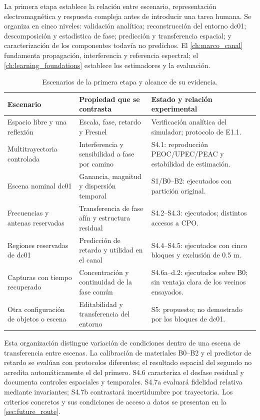 La primera etapa establece la relación entre escenario, representación electromagnética
y respuesta compleja antes de introducir una tarea humana. Se organiza en cinco niveles:
validación analítica; reconstrucción del entorno dc01; descomposición y estadística de fase;
predicción y transferencia espacial; y caracterización de los componentes todavía no
predichos. El \cref{ch:marco_canal} fundamenta propagación, interferencia y referencia
espectral; el \cref{ch:learning_foundations} establece los estimadores y la evaluación.

\begin{table}[htbp]
\centering\small
\caption{Escenarios de la primera etapa y alcance de su evidencia.}
\begin{tabularx}{\textwidth}{P{2.8cm}L L}
\toprule
Escenario & Propiedad que se contrasta & Estado y relación experimental\\
\midrule
Espacio libre y una reflexión & Escala, fase, retardo y Fresnel & Verificación analítica del simulador; protocolo de E1.1.\\
Multitrayectoria controlada & Interferencia y sensibilidad a fase por camino & S4.1: reproducción PEOC/UPEC/PEAC y estabilidad de estimación.\\
Escena nominal dc01 & Ganancia, magnitud y dispersión temporal & S1/B0--B2: ejecutados con partición original.\\
Frecuencias y antenas reservadas & Transferencia de fase afín y estructura residual & S4.2--S4.3: ejecutados; distintos accesos a CPO.\\
Regiones reservadas de dc01 & Predicción de retardo y utilidad en el canal & S4.4--S4.5: ejecutados con cinco bloques y exclusión de 0.5 m.\\
Capturas con tiempo recuperado & Concentración y continuidad de la fase común & S4.6a--d.2: ejecutados sobre B0; sin ventaja clara de los vecinos ensayados.\\
Otra configuración de objetos o escena & Editabilidad y transferencia del entorno & S5: propuesto; no demostrado por los bloques de dc01.\\
\bottomrule
\end{tabularx}
\end{table}

Esta organización distingue variación de condiciones dentro de una escena de transferencia
entre escenas. La calibración de materiales B0--B2 y el predictor de retardo se evalúan
con protocolos diferentes; el resultado espacial del segundo no acredita automáticamente
el del primero. S4.6 caracteriza el desfase residual y documenta controles
espaciales y temporales. S4.7a evaluará fidelidad relativa mediante invariantes;
S4.7b contrastará incertidumbre por trayectoria. Los criterios concretos y sus condiciones de acceso a datos se presentan en
la \cref{sec:future_route}.

